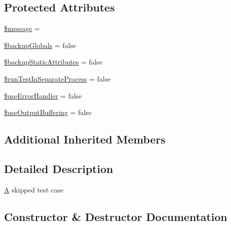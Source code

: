 \subsection*{Protected Attributes}
\begin{DoxyCompactItemize}
\item 
\mbox{\hyperlink{class_p_h_p_unit___framework___skipped_test_case_abf17cb2dba2ed17cb28aa5f37deb5293}{\$message}} = \textquotesingle{}\textquotesingle{}
\item 
\mbox{\hyperlink{class_p_h_p_unit___framework___skipped_test_case_a7c6af4e36636a61ec139a77a1c07cffe}{\$backup\+Globals}} = false
\item 
\mbox{\hyperlink{class_p_h_p_unit___framework___skipped_test_case_a563497416305ba3d1caeb0dbe4454bb3}{\$backup\+Static\+Attributes}} = false
\item 
\mbox{\hyperlink{class_p_h_p_unit___framework___skipped_test_case_a7e113cd6fbfe94d18fe43cf7bbd0f899}{\$run\+Test\+In\+Separate\+Process}} = false
\item 
\mbox{\hyperlink{class_p_h_p_unit___framework___skipped_test_case_a68c36deb5af7e39a2c8af018224eaa4d}{\$use\+Error\+Handler}} = false
\item 
\mbox{\hyperlink{class_p_h_p_unit___framework___skipped_test_case_ab15400de1ea7083389dec5da0b0a1845}{\$use\+Output\+Buffering}} = false
\end{DoxyCompactItemize}
\subsection*{Additional Inherited Members}


\subsection{Detailed Description}
\mbox{\hyperlink{class_a}{A}} skipped test case 

\subsection{Constructor \& Destructor Documentation}
\mbox{\label{class_p_h_p_unit___framework___skipped_test_case_afe6b924c0b9ead28b232f6860fc50236}} 
